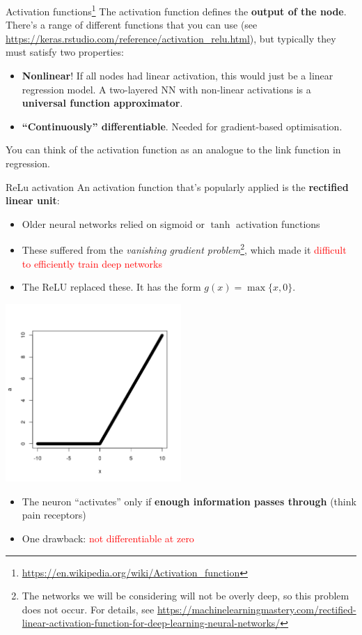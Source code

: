 \documentclass{beamer}
\begin{document}
\begin{frame}{Activation functions\footnote{\url{https://en.wikipedia.org/wiki/Activation_function}}}
The activation function defines the \textbf{output of the node}. There's a range of different functions that you can use (see \url{https://keras.rstudio.com/reference/activation_relu.html}), but typically they must satisfy two properties:  
\begin{itemize}
\item \textbf{Nonlinear}! If all nodes had linear activation, this would just be a linear regression model. A two-layered NN with non-linear activations is a \textbf{universal function approximator}.
\item \textbf{``Continuously'' differentiable}. Needed for gradient-based optimisation.
\end{itemize}
You can think of the activation function as an analogue to the link function in regression. 
\end{frame}
\begin{frame}{ReLu activation}
An activation function that's popularly applied is the \textbf{rectified linear unit}:
\begin{itemize}
\item Older neural networks relied on sigmoid or $\tanh$ activation functions
\item These suffered from the \textit{vanishing gradient problem}\footnote{The networks we will be considering will not be overly deep, so this problem does not occur. For details, see \url{https://machinelearningmastery.com/rectified-linear-activation-function-for-deep-learning-neural-networks/}}, which made it \textcolor{red}{difficult to efficiently train deep networks}
\item The ReLU replaced these. It has the form $g(x)=\max\{x,0\}$.
\end{itemize}
\begin{minipage}{0.49\linewidth}
\includegraphics[width=0.5\textwidth]{Images/ReLu.png}
\end{minipage}
\begin{minipage}{0.49\linewidth}
\begin{itemize}
\item The neuron ``activates'' only if \textbf{enough information passes through} (think pain receptors)
\item One drawback: \textcolor{red}{not differentiable at zero}
\end{itemize}
\end{minipage}
\end{frame}
\end{document}
